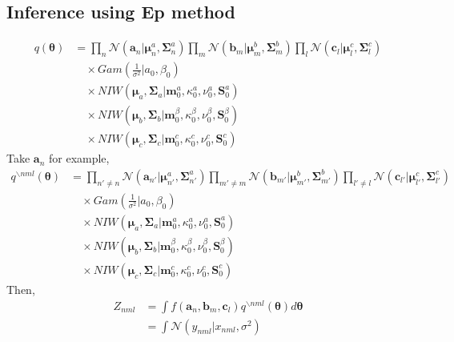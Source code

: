 \documentclass{article}
\newcommand{\bs}[1]{\boldsymbol{#1}}
\newcommand{\gs}[3]{\mathcal{N}(#1|#2,#3)}
\begin{document}
\begin{flushleft}
\section{Inference using Ep method}
\begin{equation}
\begin{split}
q(\bs{\theta}) &= \prod_n \gs{\bs{a}_n}{\bs{\mu}_n^a}{\bs{\Sigma}_n^a}
                 \prod_m \gs{\bs{b}_m}{\bs{\mu}_m^b}{\bs{\Sigma}_m^b}
                 \prod_l \gs{\bs{c}_l}{\bs{\mu}_l^c}{\bs{\Sigma}_l^c}\\
                 & \quad \times Gam(\frac{1}{\sigma^2}|a_0,\beta_0)\\
                 & \quad \times NIW(\bs{\mu}_a, \bs{\Sigma}_a|\bs{m}^a_0,\kappa^a_0,\nu^a_0,\bs{S}^a_0) \\
                 & \quad \times NIW(\bs{\mu}_b, \bs{\Sigma}_b|\bs{m}^\beta_0,\kappa^\beta_0,\nu^\beta_0,\bs{S}^\beta_0)\\
                 & \quad \times NIW(\bs{\mu}_c, \bs{\Sigma}_c|\bs{m}^c_0,\kappa^c_0,\nu^c_0,\bs{S}^c_0)
\end{split}
\end{equation}
Take ${\bs{a}_n}$ for example,
\begin{equation}
	\begin{split}
		q^{ \backslash nml}(\bs{\theta}) &= \prod_{n' \neq n} \gs{\bs{a}_{n'}}{\bs{\mu}_{n'}^a}{\bs{\Sigma}_{n'}^a}
                 \prod_{m' \neq m} \gs{\bs{b}_{m'}}{\bs{\mu}_{m'}^b}{\bs{\Sigma}_{m'}^b}
                 \prod_{l' \neq l} \gs{\bs{c}_{l'}}{\bs{\mu}_{l'}^c}{\bs{\Sigma}_{l'}^c}\\
                 & \quad \times Gam(\frac{1}{\sigma^2}|a_0,\beta_0)\\
                 & \quad \times NIW(\bs{\mu}_a, \bs{\Sigma}_a|\bs{m}^a_0,\kappa^a_0,\nu^a_0,\bs{S}^a_0) \\
                 & \quad \times NIW(\bs{\mu}_b, \bs{\Sigma}_b|\bs{m}^\beta_0,\kappa^\beta_0,\nu^\beta_0,\bs{S}^\beta_0)\\
                 & \quad \times NIW(\bs{\mu}_c, \bs{\Sigma}_c|\bs{m}^c_0,\kappa^c_0,\nu^c_0,\bs{S}^c_0)
	\end{split}
\end{equation}
Then,
\begin{equation}
	\begin{split}
	Z_{nml} &= \int f(\bs{a}_n,\bs{b}_m,\bs{c}_l)q^{\backslash nml}(\bs{\theta}) d \bs{\theta}\\
	             &= \int \gs{y_{nml}}{x_{nml}}{\sigma^2}

\end{split}
\end{equation}
\end{flushleft}
\end{document}
